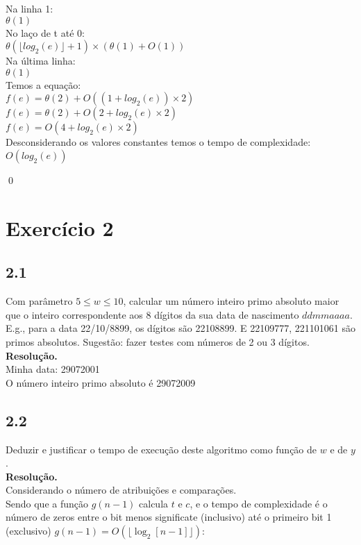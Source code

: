 \documentclass[12pt,letterpaper]{article}
\newcommand\answer{\textbf{Resolução.}\xspace}
\begin{document}
Na linha 1: \\
$\theta(1)$ \\

No laço de t até 0: \\
$\theta(\lfloor log_2(e) \rfloor + 1) \times (\theta(1) + O(1))$ \\

Na última linha: \\
$\theta(1)$ \\

Temos a equação: \\
$f(e) = \theta(2) + O((1 + log_2(e)) \times 2)$ \\
$f(e) = \theta(2) + O(2 + log_2(e) \times 2)$ \\
$f(e) = O(4 + log_2(e) \times 2)$ \\

Desconsiderando os valores constantes temos o tempo de complexidade: \\
$O(log_2(e))$

\qed

\section*{Exercício 2}

\subsection*{2.1}
Com parâmetro $5 \leq w \leq 10$, calcular um número inteiro primo absoluto maior que o inteiro correspondente aos 8 dígitos da sua data de nascimento $ddmmaaaa$. E.g., para a data 22/10/8899, os dígitos são 22108899. E 22109777, 221101061 são primos absolutos. Sugestão: fazer testes com números de 2 ou 3 dígitos. \\

\answer \\
Minha data: 29072001 \\
O número inteiro primo absoluto é 29072009 \\

\subsection*{2.2}
Deduzir e justificar o tempo de execução deste algoritmo como função de $w$ e de $y$. \\

\answer \\
Considerando o número de atribuições e comparações. \\
Sendo que a função $g(n-1)$ calcula $t$ e $c$, e o tempo de complexidade é o número de zeros entre o bit menos significate (inclusivo) até o primeiro bit 1 (exclusivo) $g(n-1) = O(\lfloor \log_2 \left[ n-1 \right] \rfloor)$: \\
\end{document}
